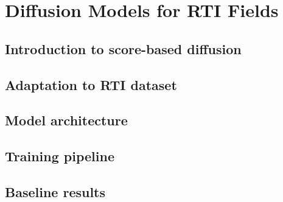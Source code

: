 \chapter{Diffusion Models for RTI Fields}

\section{Introduction to score-based diffusion}

\section{Adaptation to RTI dataset}

\section{Model architecture}

\section{Training pipeline}

\section{Baseline results}